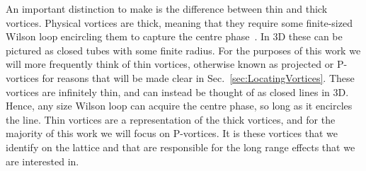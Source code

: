 An important distinction to make is the difference between thin and thick vortices. Physical vortices are thick, meaning that they require some finite-sized Wilson loop encircling them to capture the centre phase~\cite{Faber:1997rp}. In 3D these can be pictured as closed tubes with some finite radius. For the purposes of this work we will more frequently think of thin vortices, otherwise known as projected or P-vortices for reasons that will be made clear in Sec.~\ref{sec:LocatingVortices}. These vortices are infinitely thin, and can instead be thought of as closed lines in 3D. Hence, any size Wilson loop can acquire the centre phase, so long as it encircles the line. Thin vortices are a representation of the thick vortices, and for the majority of this work we will focus on P-vortices. It is these vortices that we identify on the lattice and that are responsible for the long range effects that we are interested in.\\

